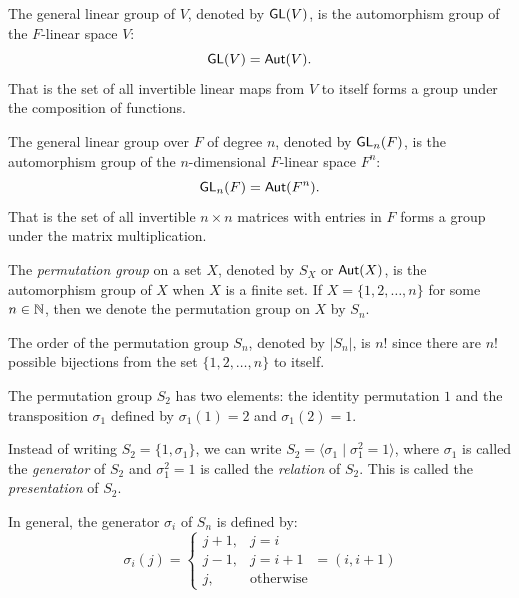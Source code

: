 \begin{example}
  The general linear group of $V$, denoted by $\operatorname{\text{\normalfont\sffamily GL}}(V)$, is the automorphism group of the $F$-linear space $V$:
  \[
    \operatorname{\text{\normalfont\sffamily GL}}(V) = \operatorname{\text{\normalfont\sffamily Aut}}(V).
  \]
  That is the set of all invertible linear maps from $V$ to itself forms a group under the composition of functions.
\end{example}

\begin{example}
  The general linear group over $F$ of degree $n$, denoted by $\operatorname{\text{\normalfont\sffamily GL}}_n(F)$, is the automorphism group of the $n$-dimensional $F$-linear space $F^n$:
  \[
    \operatorname{\text{\normalfont\sffamily GL}}_n(F) = \operatorname{\text{\normalfont\sffamily Aut}}(F^n).
  \]
  That is the set of all invertible $n \times n$ matrices with entries in $F$ forms a group under the matrix multiplication.
\end{example}

\begin{definition}\label{def:permutation_group}
  The \emph{permutation group} on a set $X$, denoted by $S_X$ or $\operatorname{\text{\normalfont\sffamily Aut}}(X)$, is the automorphism group of $X$ when $X$ is a finite set. If $X = \{1, 2, \ldots, n\}$ for some $n \in \operatorname{\mathbb{N}}$, then we denote the permutation group on $X$ by $S_n$.
\end{definition}

The order of the permutation group $S_n$, denoted by $|S_n|$, is $n!$ since there are $n!$ possible bijections from the set $\{1, 2, \ldots, n\}$ to itself.

\begin{example}
  The permutation group $S_2$ has two elements: the identity permutation $1$ and the transposition $\sigma_1$ defined by $\sigma_1(1) = 2$ and $\sigma_1(2) = 1$.
\end{example}

Instead of writing $S_2 = \{ 1, \sigma_1 \}$, we can write $S_2 = \langle \sigma_1 \mid \sigma_1^2 = 1 \rangle$, where $\sigma_1$ is called the \emph{generator} of $S_2$ and $\sigma_1^2 = 1$ is called the \emph{relation} of $S_2$. This is called the \emph{presentation} of $S_2$.

In general, the generator $\sigma_i$ of $S_n$ is defined by:
\[
  \sigma_i(j) = \begin{cases}
    j + 1, & j = i            \\
    j - 1, & j = i + 1        \\
    j,     & \text{otherwise}
  \end{cases} = (i, i + 1)
\]

